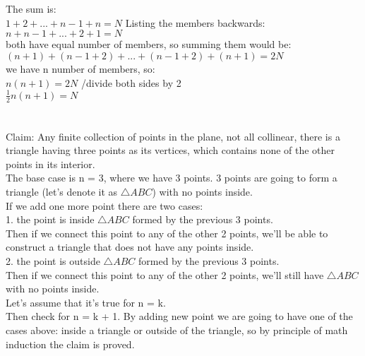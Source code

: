 \documentclass{article}
\begin{document}
\section{}
The sum is:\\
$1 + 2 + ... + n-1 + n = N$
Listing the members backwards:\\
$n + n - 1 + ... + 2 + 1 = N$\\
both have equal number of members, so summing them would be:\\
$(n + 1) + (n - 1 + 2) + ... + (n-1+2) + (n+1) = 2N$\\
we have n number of members, so:\\
$n(n+1) = 2N$ /divide both sides by 2\\
$\frac{1}{2}n(n+1) = N$\\

\section{}
Claim: Any finite collection of points in the plane, not all collinear, there is a triangle having three points as its vertices, which contains none of the other points in its interior.\\
The base case is n = 3, where we have 3 points. 3 points are going to form a triangle (let's denote it as $\triangle ABC$) with no points inside.\\
If we add one more point there are two cases:\\
1. the point is inside $\triangle ABC$ formed by the previous 3 points.\\
Then if we connect this point to any of the other 2 points, we'll be able to construct a triangle that does not have any points inside.\\
2. the point is outside $\triangle ABC$ formed by the previous 3 points.\\
Then if we connect this point to any of the other 2 points, we'll still have $\triangle ABC$ with no points inside.\\
Let's assume that it's true for n = k.\\
Then check for n = k + 1. By adding new point we are going to have one of the cases above: inside a triangle or outside of the triangle, so by principle of math induction the claim is proved.\\
\end{document}
